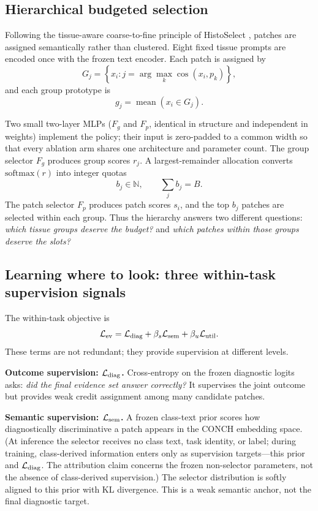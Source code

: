 \documentclass{article}
\def\L{{\cal L}}
\newcommand{\Fg}{F_g}
\newcommand{\Fp}{F_p}
\begin{document}
\subsection{Hierarchical budgeted selection}
\label{ssec:hier}

Following the tissue-aware coarse-to-fine principle of HistoSelect \cite{huang2026histoselect}, patches are assigned semantically rather than clustered.
Eight fixed tissue prompts are encoded once with the frozen text encoder.
Each patch is assigned by
\[
G_j=\left\{x_i:
j=\arg\max_k \cos(x_i,p_k)\right\},
\]
and each group prototype is
\[
g_j=\operatorname{mean}(x_i\in G_j).
\]

Two small two-layer MLPs ($\Fg$ and $\Fp$, identical in structure and independent in weights) implement the policy; their input is zero-padded to a common width so that every ablation arm shares one architecture and parameter count.
The group selector $\Fg$ produces group scores $r_j$.
A largest-remainder allocation converts $\mathrm{softmax}(r)$ into integer quotas
\[
b_j\in\mathbb{N}, \qquad \sum_j b_j=B.
\]
The patch selector $\Fp$ produces patch scores $s_i$, and the top $b_j$ patches are selected within each group.
Thus the hierarchy answers two different questions:
\emph{which tissue groups deserve the budget?} and \emph{which patches within those groups deserve the slots?}

\subsection{Learning where to look: three within-task supervision signals}
\label{ssec:within}

The within-task objective is
\begin{equation}
\L_{\mathrm{ev}}
=
\L_{\mathrm{diag}}
+\beta_s\L_{\mathrm{sem}}
+\beta_u\L_{\mathrm{util}}.
\end{equation}
These terms are not redundant; they provide supervision at different levels.

\textbf{Outcome supervision: $\L_{\mathrm{diag}}$.}
Cross-entropy on the frozen diagnostic logits asks:
\emph{did the final evidence set answer correctly?}
It supervises the joint outcome but provides weak credit assignment among many candidate patches.

\textbf{Semantic supervision: $\L_{\mathrm{sem}}$.}
A frozen class-text prior scores how diagnostically discriminative a patch appears in the CONCH embedding space. (At inference the selector receives no class text, task identity, or label; during training, class-derived information enters only as supervision targets---this prior and $\L_{\rm diag}$. The attribution claim concerns the frozen non-selector parameters, not the absence of class-derived supervision.)
The selector distribution is softly aligned to this prior with KL divergence.
This is a weak semantic anchor, not the final diagnostic target.
\end{document}

